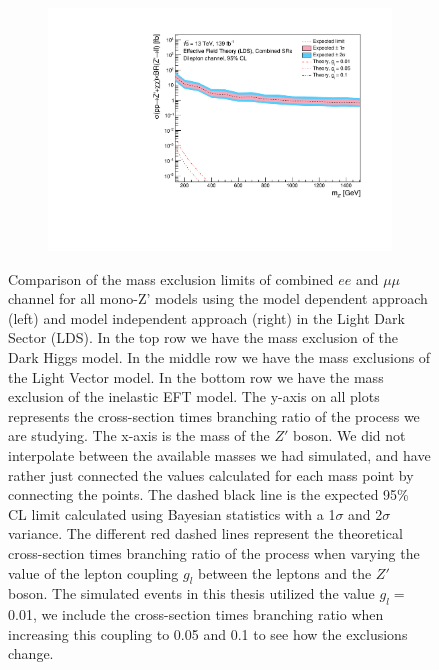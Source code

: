 \documentclass[12pt, a4paper]{book}
\begin{document}
\begin{figure}[!ht]
\begin{subfigure}[b]{0.49\textwidth}
   \end{subfigure}
   \hfill
   \begin{subfigure}[b]{0.49\textwidth}
      \centering
      \includegraphics[width=1\textwidth]{Limits/Model_independent/EFT_LDS/mass_exclusion_comb.pdf}
   \end{subfigure}
   \caption[Comparison of mass exclusion limits of dilepton channel for all mono-Z' models using the model dependent and independent approach in the LDS]{Comparison of the mass exclusion limits of combined $ee$ and $\mu\mu$ channel for all mono-Z' models using the model dependent approach (left) and model independent approach (right) in the Light Dark Sector (LDS). 
   In the top row we have the mass exclusion of the Dark Higgs model. In the middle row we have the mass exclusions of the Light Vector model. In the bottom row we have the mass exclusion of the inelastic EFT model.
   The y-axis on all plots represents the cross-section times branching ratio of the process we are studying. The x-axis is the mass of the $Z'$ boson. We did not interpolate between the available masses we had simulated, 
   and have rather just connected the values calculated for each mass point by connecting the points. The dashed black line is the expected 95\% CL limit calculated using Bayesian statistics with a 1$\sigma$ and 2$\sigma$ variance. 
   The different red dashed lines represent the theoretical cross-section times branching ratio of the process when varying the value of the lepton coupling $g_l$ between the leptons and the $Z'$ boson. The simulated events in this thesis utilized the value $g_l=$ 0.01, we include the cross-section times branching ratio when increasing this coupling to 0.05 and 0.1 to see how the exclusions change. 
   }\label{fig:comp_LDS}
\end{figure}


\clearpage
\end{document}
